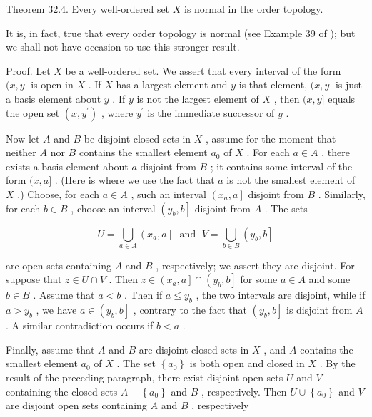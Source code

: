 Theorem 32.4. Every well-ordered set \(X\) is normal in the order topology.

It is, in fact, true that every order topology is normal (see Example 39 of \cite{SteenSeebach1970}); but we shall not have occasion to use this stronger result.

Proof. Let \(X\) be a well-ordered set. We assert that every interval of the form \((x,y\rbrack\) is open in \(X\) . If \(X\) has a largest element and \(y\) is that element, \((x,y\rbrack\) is just a basis element about \(y\) . If \(y\) is not the largest element of \(X\) , then \((x,y\rbrack\) equals the open set \(\left( {x,{y}^{\prime }}\right)\) , where \({y}^{\prime }\) is the immediate successor of \(y\) .

Now let \(A\) and \(B\) be disjoint closed sets in \(X\) , assume for the moment that neither \(A\) nor \(B\) contains the smallest element \({a}_{0}\) of \(X\) . For each \(a \in  A\) , there exists a basis element about \(a\) disjoint from \(B\) ; it contains some interval of the form \((x,a\rbrack\) . (Here is where we use the fact that \(a\) is not the smallest element of \(X\) .) Choose, for each \(a \in  A\) , such an interval \(\left( {{x}_{a},a}\right\rbrack\) disjoint from \(B\) . Similarly, for each \(b \in  B\) , choose an interval \(\left( {{y}_{b},b}\right\rbrack\) disjoint from \(A\) . The sets

\[
U = \mathop{\bigcup }\limits_{{a \in  A}}\left( {{x}_{a},a}\right\rbrack  \;\text{ and }\;V = \mathop{\bigcup }\limits_{{b \in  B}}\left( {{y}_{b},b}\right\rbrack
\]

are open sets containing \(A\) and \(B\) , respectively; we assert they are disjoint. For suppose that \(z \in  U \cap  V\) . Then \(z \in  \left( {{x}_{a},a}\right\rbrack   \cap  \left( {{y}_{b},b}\right\rbrack\) for some \(a \in  A\) and some \(b \in  B\) . Assume that \(a < b\) . Then if \(a \leq  {y}_{b}\) , the two intervals are disjoint, while if \(a > {y}_{b}\) , we have \(a \in  \left( {{y}_{b},b}\right\rbrack\) , contrary to the fact that \(\left( {{y}_{b},b}\right\rbrack\) is disjoint from \(A\) . A similar contradiction occurs if \(b < a\) .

Finally, assume that \(A\) and \(B\) are disjoint closed sets in \(X\) , and \(A\) contains the smallest element \({a}_{0}\) of \(X\) . The set \(\left\{  {a}_{0}\right\}\) is both open and closed in \(X\) . By the result of the preceding paragraph, there exist disjoint open sets \(U\) and \(V\) containing the closed sets \(A - \left\{  {a}_{0}\right\}\) and \(B\) , respectively. Then \(U \cup  \left\{  {a}_{0}\right\}\) and \(V\) are disjoint open sets containing \(A\) and \(B\) , respectively

